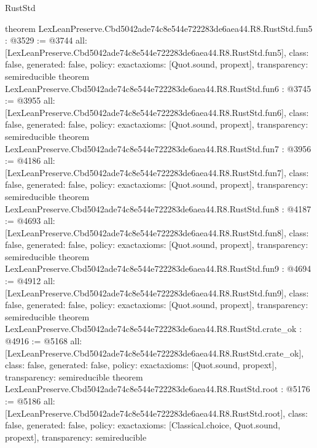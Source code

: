 \begin{lexlean}{RustStd}
\begin{coremodule}
{}
theorem LexLeanPreserve.Cbd5042ade74c8e544e722283de6aea44.R8.RustStd.fun5 : @3529 := @3744 {
  all: [LexLeanPreserve.Cbd5042ade74c8e544e722283de6aea44.R8.RustStd.fun5],
  class: false,
  generated: false,
  policy: exact{axioms: [Quot.sound, propext]},
  transparency: semireducible
}
theorem LexLeanPreserve.Cbd5042ade74c8e544e722283de6aea44.R8.RustStd.fun6 : @3745 := @3955 {
  all: [LexLeanPreserve.Cbd5042ade74c8e544e722283de6aea44.R8.RustStd.fun6],
  class: false,
  generated: false,
  policy: exact{axioms: [Quot.sound, propext]},
  transparency: semireducible
}
theorem LexLeanPreserve.Cbd5042ade74c8e544e722283de6aea44.R8.RustStd.fun7 : @3956 := @4186 {
  all: [LexLeanPreserve.Cbd5042ade74c8e544e722283de6aea44.R8.RustStd.fun7],
  class: false,
  generated: false,
  policy: exact{axioms: [Quot.sound, propext]},
  transparency: semireducible
}
theorem LexLeanPreserve.Cbd5042ade74c8e544e722283de6aea44.R8.RustStd.fun8 : @4187 := @4693 {
  all: [LexLeanPreserve.Cbd5042ade74c8e544e722283de6aea44.R8.RustStd.fun8],
  class: false,
  generated: false,
  policy: exact{axioms: [Quot.sound, propext]},
  transparency: semireducible
}
theorem LexLeanPreserve.Cbd5042ade74c8e544e722283de6aea44.R8.RustStd.fun9 : @4694 := @4912 {
  all: [LexLeanPreserve.Cbd5042ade74c8e544e722283de6aea44.R8.RustStd.fun9],
  class: false,
  generated: false,
  policy: exact{axioms: [Quot.sound, propext]},
  transparency: semireducible
}
theorem LexLeanPreserve.Cbd5042ade74c8e544e722283de6aea44.R8.RustStd.crate_ok : @4916 := @5168 {
  all: [LexLeanPreserve.Cbd5042ade74c8e544e722283de6aea44.R8.RustStd.crate_ok],
  class: false,
  generated: false,
  policy: exact{axioms: [Quot.sound, propext]},
  transparency: semireducible
}
theorem LexLeanPreserve.Cbd5042ade74c8e544e722283de6aea44.R8.RustStd.root : @5176 := @5186 {
  all: [LexLeanPreserve.Cbd5042ade74c8e544e722283de6aea44.R8.RustStd.root],
  class: false,
  generated: false,
  policy: exact{axioms: [Classical.choice, Quot.sound, propext]},
  transparency: semireducible
}


\end{coremodule}
\end{lexlean}
